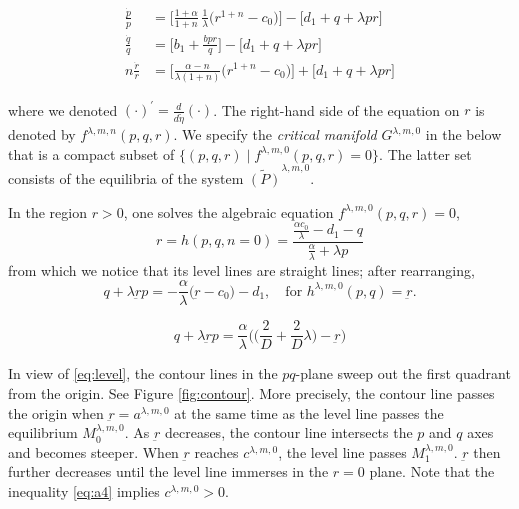 \documentclass[a4paper,11pt]{article}
\def\dpp{\dot{p}}
\def\dqq{\dot{q}}
\def\drr{\dot{r}}
\begin{document}
\begin{align*}
 \frac{\dpp}{p}&=\Big[\frac{1+\alpha}{1+n}\,\frac{1}{\lambda }\Big(r^{1+n}-c_0\Big)\Big] -\Big[d_1 + q + \lambda pr\Big]\\
 \frac{\dqq}{q}&=\Big[b_1 +\frac{bpr}{q}\Big] -\Big[d_1 + q + \lambda pr\Big]\\
 n\frac{\drr}{r}&=\Big[\frac{\alpha-n}{\lambda(1+n)}\Big(r^{1+n}-c_0\Big)\Big]+\Big[d_1 + q + \lambda pr\Big]
\end{align*}

\noindent where we denoted $(\cdot)^\prime = \frac{d}{d\tilde{\eta}}(\cdot)$. 
The right-hand side of the equation on $r$ is denoted by $f^{\lambda,m,n}(p,q,r)$. We specify the {\it critical manifold} $G^{\lambda,m,0}$ in the below that is a compact subset of $\{(p,q,r)\;|\; f^{\lambda,m,0}(p,q,r)=0\}$. The latter set consists of the equilibria of the system $\tilde{(P)}^{\lambda,m,0}$. 

In the region $r>0$, one solves the algebraic equation $f^{\lambda,m,0}(p,q,r)=0$,
\begin{equation}\label{eq:hn0}
 r=h(p,q,n=0) = \frac{ \frac{\alpha c_0}{\lambda} - d_1 -q }{ \frac{\alpha}{\lambda} + \lambda p}
\end{equation} 
from which we notice that its level lines are straight lines; after rearranging, 
\begin{equation}
 q + \lambda \underbar{r}p =  -\frac{\alpha}{\lambda} \big( \underbar{r} - c_0\big)-d_1, \quad \text{for  $h^{\lambda,m,0}(p,q)=\underbar{r}$.} \label{eq:level}
\end{equation}

\begin{equation}
 q + \lambda \underbar{r}p =  \frac{\alpha}{\lambda} \Big( \big(\frac{2}{D} + \frac{2}{D}\lambda\big) - \underbar{r} \Big)
\end{equation}

In view of \eqref{eq:level}, the contour lines in the $pq$-plane sweep out the first quadrant from the origin. See Figure \ref{fig:contour}. More precisely, the contour line passes the origin when $\underbar{r}=a^{ \lambda,m,0}$ at the same time as the level line passes the equilibrium $M_0^{ \lambda,m,0}$. As $\underbar{r}$ decreases, the contour line intersects the $p$ and $q$ axes and becomes steeper. When $\underbar{r}$ reaches $c^{ \lambda,m,0}$, the level line passes $M_1^{ \lambda,m,0}$. $\underbar{r}$ then further decreases until the level line immerses in the $r=0$ plane. Note that the inequality \eqref{eq:a4} implies $c^{ \lambda,m,0}>0$. 
\end{document}
